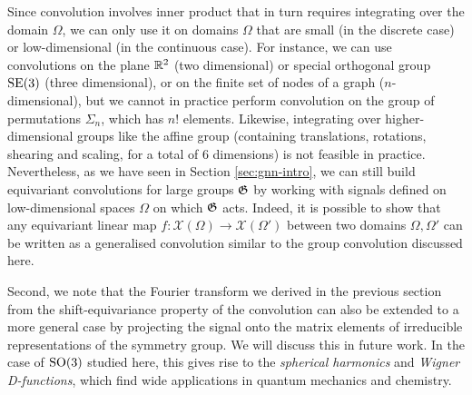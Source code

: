 %

Since convolution involves inner product that in turn requires integrating over the domain $\Omega$, we can only use it on domains $\Omega$ that are small (in the discrete case) or low-dimensional (in the continuous case).  
% 
For instance, we can use convolutions on the plane $\mathbb{R}^2$ (two dimensional) or special orthogonal group $\operatorname{SE}(3)$ (three dimensional), or on the finite set of nodes of a graph ($n$-dimensional), but we cannot in practice perform convolution on the group of permutations $\Sigma_n$, which has $n!$ elements. 
%
Likewise, integrating over higher-dimensional groups like the affine group (containing  translations, rotations, shearing and scaling, for a total of $6$ dimensions) is not feasible in practice. 
%
Nevertheless, as we have seen in Section \ref{sec:gnn-intro}, we can still build equivariant convolutions for large groups ${\mathfrak{G}}$ by working with signals defined on low-dimensional spaces $\Omega$ on which ${\mathfrak{G}}$ acts.
Indeed, it is possible to show that any equivariant linear map $f : \mathcal{X}(\Omega) \rightarrow \mathcal{X}(\Omega')$ between two domains $\Omega, \Omega'$ can be written as a generalised convolution similar to the group convolution discussed here. %

Second, we note that the Fourier transform we derived in the previous section from the shift-equivariance property of the convolution can also be extended to a more general case by projecting the signal onto the matrix elements of irreducible representations of the symmetry group. We will discuss this in future work. 
%
In the case of $\operatorname{SO}(3)$ studied here, this gives rise to the {\em spherical harmonics} and {\em Wigner D-functions}, which find wide applications in quantum mechanics and chemistry.


